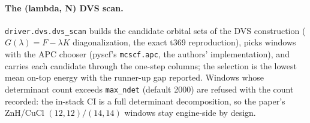 \paragraph{The (lambda, N) DVS scan.}
\texttt{driver.dvs.dvs\_scan} builds the candidate orbital sets of the
DVS construction ($G(\lambda) = F - \lambda K$ diagonalization, the
exact t369 reproduction), picks windows with the APC chooser (pyscf's
\texttt{mcscf.apc}, the authors' implementation), and carries each
candidate through the one-step columns; the selection is the lowest
mean on-top energy with the runner-up gap reported.  Windows whose
determinant count exceeds \texttt{max\_ndet} (default 2000) are
refused with the count recorded: the in-stack CI is a full determinant
decomposition, so the paper's ZnH/CuCl $(12,12)/(14,14)$ windows stay
engine-side by design.

